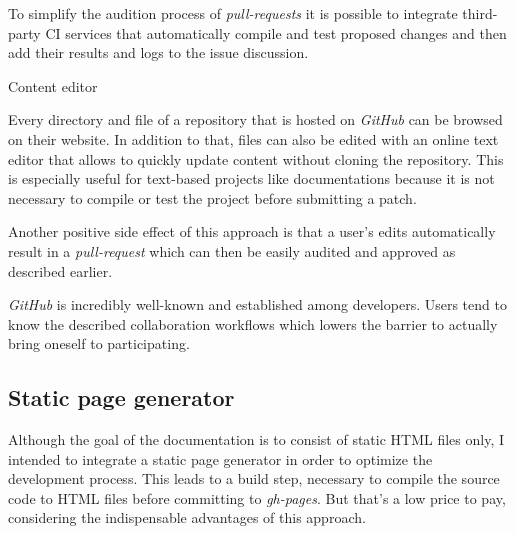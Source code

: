 \begin{description}
	To simplify the audition process of \textit{pull-requests} it is possible to integrate third-party \ac{CI} services that automatically compile and test proposed changes and then add their results and logs to the issue discussion.

	\begin{minipage}{\linewidth}

		\item[Content editor]\hfill

		Every directory and file of a repository that is hosted on \textit{GitHub} can be browsed on their website. In addition to that, files can also be edited with an online text editor that allows to quickly update content without cloning the repository. This is especially useful for text-based projects like documentations because it is not necessary to compile or test the project before submitting a patch.

		Another positive side effect of this approach is that a user's edits automatically result in a \textit{pull-request} which can then be easily audited and approved as described earlier.

	\end{minipage}

	\item[Popularity]\hfill

	\textit{GitHub} is incredibly well-known and established among developers. Users tend to know the described collaboration workflows which lowers the barrier to actually bring oneself to participating.

\end{description}

\subsection{Static page generator}

Although the goal of the documentation is to consist of static \ac{HTML} files only, I intended to integrate a static page generator in order to optimize the development process. This leads to a build step, necessary to compile the source code to \ac{HTML} files before committing to \textit{gh-pages}. But that's a low price to pay, considering the indispensable advantages of this approach.

